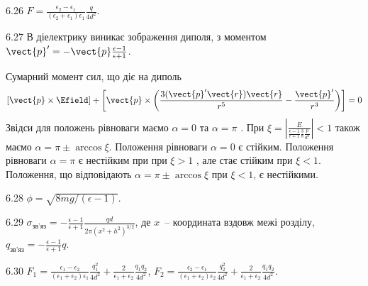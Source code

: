 \begin{Solution}{6.{26}}
	$F = \frac{\epsilon_2 - \epsilon_1}{(\epsilon_2 + \epsilon_1)\epsilon_1} \frac{q}{4d^2}$.
\end{Solution}
\begin{Solution}{6.{27}}
	В діелектрику виникає зображення диполя, з моментом $\vect{p}' = -\vect{p}\frac{\epsilon - 1}{\epsilon + 1}$.

	Сумарний момент сил, що діє на диполь
    \[
        \left[\vect{p}\times\Efield\right] + \left[\vect{p}\times\left( \frac{3(\vect{p}'\vect{r})\vect{r}}{r^5} - \frac{\vect{p}'}{r^3} \right) \right] = 0
    \]
Звідси для положень рівноваги маємо $\alpha=0$ та $\alpha = \pi$ . При $\xi = \left|\frac{E}{\frac{\epsilon - 1}{\epsilon + 1} \frac38\frac{p}{d^3}}\right|<1$  також маємо $\alpha = \pi \pm \arccos\xi$.
Положення рівноваги $\alpha = 0$  є стійким. Положення рівноваги $\alpha = \pi$ є нестійким при при $\xi >1$ , але стає стійким при $\xi < 1$. Положення, що відповідають $\alpha = \pi \pm \arccos\xi$  при $\xi <1$, є нестійкими.
\end{Solution}
\begin{Solution}{6.{28}}
	$\phi = \sqrt{8mg/(\epsilon-1)}$.
\end{Solution}
\begin{Solution}{6.{29}}
	$\sigma_\text{зв'яз} = - \frac{\epsilon - 1}{\epsilon + 1} \frac{qd}{2\pi(x^2  +h^2)^{3/2}}$, де $x$~-- координата вздовж межі розділу, $q_\text{зв'яз} = - \frac{\epsilon - 1}{\epsilon + 1}q$.
\end{Solution}
\begin{Solution}{6.{30}}
	$F_1 = \frac{\epsilon_1 - \epsilon_2}{(\epsilon_1 + \epsilon_2)\epsilon_1} \frac{q_1^2}{4d^2} + \frac{2}{\epsilon_1 + \epsilon_2} \frac{q_1q_2}{4d^2}$,
	$F_2 = \frac{\epsilon_2 - \epsilon_1}{(\epsilon_1 + \epsilon_2)\epsilon_2} \frac{q_2^2}{4d^2} + \frac{2}{\epsilon_1 + \epsilon_2} \frac{q_1q_2}{4d^2}$.
\end{Solution}
